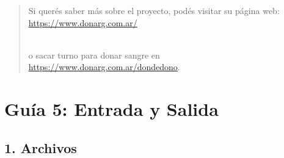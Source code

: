 \documentclass[
  letterpaper,
  DIV=11,
  numbers=noendperiod]{scrreprt}
\begin{document}
\begin{enumerate}
  \begin{quote}
  Si querés saber más sobre el proyecto, podés visitar su página web:\\
  \url{https://www.donarg.com.ar/}\strut \\
  o sacar turno para donar sangre en\\
  \url{https://www.donarg.com.ar/dondedono}.
  \end{quote}
\end{enumerate}

\section*{Guía 5: Entrada y Salida}\label{guuxeda-5-entrada-y-salida}


\subsection*{1. Archivos}\label{archivos-1}
\end{document}
